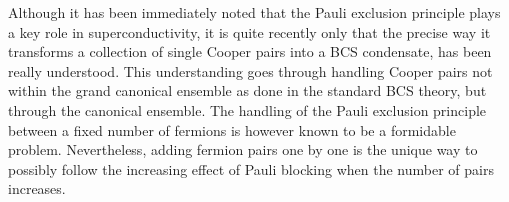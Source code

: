 \documentclass[aps,prb,superscriptaddress,twocolumn]{revtex4}
\begin{document}








Although it has been immediately noted that the Pauli exclusion principle
plays a key role in superconductivity, it is quite recently only that the
precise way it transforms a collection of single Cooper pairs into a BCS
condensate, has been really understood. This understanding goes through
handling Cooper pairs not within the grand canonical ensemble as done in the
standard BCS theory, but through the canonical ensemble. The handling of the
Pauli exclusion principle between a fixed number of fermions is however
known to be a formidable problem. Nevertheless, adding fermion pairs one by
one is the unique way to possibly follow the increasing effect of Pauli
blocking when the number of pairs increases.
\end{document}

